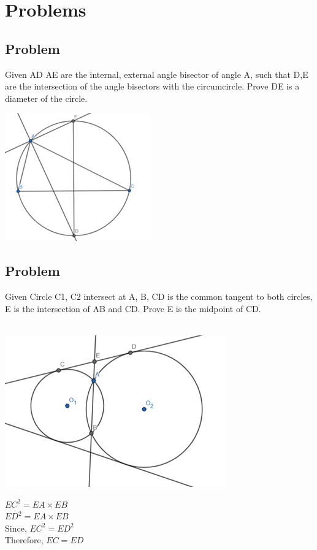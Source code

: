 \documentclass{article}
\begin{document}
\section{Problems}

\subsection{Problem}
Given AD AE are the internal, external angle bisector of angle A,
 such that D,E are the intersection of the angle bisectors with the circumcircle. 
 Prove DE is a diameter of the circle.

\includegraphics{Picture16.png}

\vspace{50px}

\subsection{Problem}
Given Circle C1, C2 intersect at A, B, CD is the common tangent to both circles, 
E is the intersection of AB and CD. Prove E is the midpoint of CD.
\\\\
\begin{minipage}{0.2\linewidth}
\includegraphics{Picture17.png}
\end{minipage}
\hfill
\begin{minipage}{0.35\linewidth}
$EC^2=EA\times EB$\\
$ED^2=EA\times EB$\\
Since, $EC^2=ED^2$\\
Therefore, $EC=ED$
\end{minipage}
\pagebreak
\end{document}
